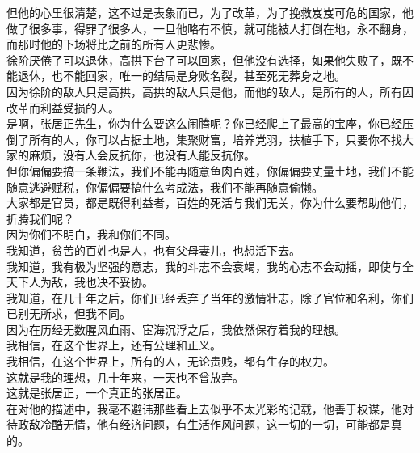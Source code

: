 \begin{multicols}{\theparacolNo}
但他的心里很清楚，这不过是表象而已，为了改革，为了挽救岌岌可危的国家，他做了很多事，得罪了很多人，一旦他略有不慎，就可能被人打倒在地，永不翻身，而那时他的下场将比之前的所有人更悲惨。\\

徐阶厌倦了可以退休，高拱下台了可以回家，但他没有选择，如果他失败了，既不能退休，也不能回家，唯一的结局是身败名裂，甚至死无葬身之地。\\

因为徐阶的敌人只是高拱，高拱的敌人只是他，而他的敌人，是所有的人，所有因改革而利益受损的人。\\

是啊，张居正先生，你为什么要这么闹腾呢？你已经爬上了最高的宝座，你已经压倒了所有的人，你可以占据土地，集聚财富，培养党羽，扶植手下，只要你不找大家的麻烦，没有人会反抗你，也没有人能反抗你。\\

但你偏偏要搞一条鞭法，我们不能再随意鱼肉百姓，你偏偏要丈量土地，我们不能随意逃避赋税，你偏偏要搞什么考成法，我们不能再随意偷懒。\\

大家都是官员，都是既得利益者，百姓的死活与我们无关，你为什么要帮助他们，折腾我们呢？\\

因为你们不明白，我和你们不同。\\

我知道，贫苦的百姓也是人，也有父母妻儿，也想活下去。\\

我知道，我有极为坚强的意志，我的斗志不会衰竭，我的心志不会动摇，即使与全天下人为敌，我也决不妥协。\\

我知道，在几十年之后，你们已经丢弃了当年的激情壮志，除了官位和名利，你们已别无所求，但我不同。\\

因为在历经无数腥风血雨、宦海沉浮之后，我依然保存着我的理想。\\

我相信，在这个世界上，还有公理和正义。\\

我相信，在这个世界上，所有的人，无论贵贱，都有生存的权力。\\

这就是我的理想，几十年来，一天也不曾放弃。\\

这就是张居正，一个真正的张居正。\\

在对他的描述中，我毫不避讳那些看上去似乎不太光彩的记载，他善于权谋，他对待政敌冷酷无情，他有经济问题，有生活作风问题，这一切的一切，可能都是真的。\\


\end{multicols}
